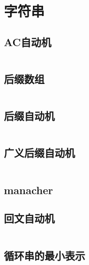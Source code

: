 \chapter{字符串}
\section{AC自动机}
\inputminted{cpp}{\source/string/Aho-Corasick-automaton.cpp}
\section{后缀数组}
\inputminted{cpp}{\source/string/suffix-array.cpp}
\section{后缀自动机}
\inputminted{cpp}{\source/string/suffix-automaton.cpp}
\section{广义后缀自动机}
\inputminted{cpp}{\source/string/ex-suffix-automaton.cpp}
\section{manacher}
\section{回文自动机}
\inputminted{cpp}{\source/string/palindromic-tree.cpp}
\section{循环串的最小表示}
